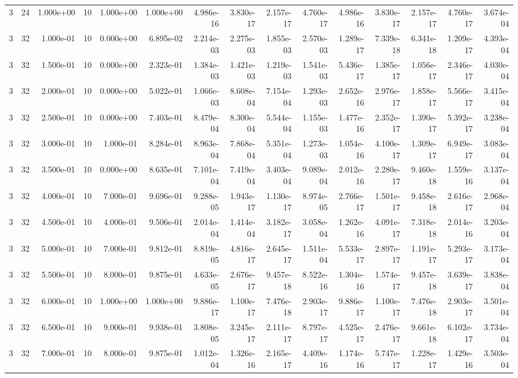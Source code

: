 \begin{tabular}{rrrrrrrrrrrrrrr}
3 & 24 & 1.000e+00 & 10 & 1.000e+00 & 1.000e+00 & 4.986e-16 & 3.830e-17 & 2.157e-17 & 4.760e-17 & 4.986e-16 & 3.830e-17 & 2.157e-17 & 4.760e-17 & 3.674e-04 \\
3 & 32 & 1.000e-01 & 10 & 0.000e+00 & 6.895e-02 & 2.214e-03 & 2.275e-03 & 1.855e-03 & 2.570e-03 & 1.289e-17 & 7.339e-18 & 6.341e-18 & 1.209e-17 & 4.393e-04 \\
3 & 32 & 1.500e-01 & 10 & 0.000e+00 & 2.323e-01 & 1.384e-03 & 1.421e-03 & 1.219e-03 & 1.541e-03 & 5.436e-17 & 1.385e-17 & 1.056e-17 & 2.346e-17 & 4.030e-04 \\
3 & 32 & 2.000e-01 & 10 & 0.000e+00 & 5.022e-01 & 1.066e-03 & 8.608e-04 & 7.154e-04 & 1.293e-03 & 2.652e-16 & 2.976e-17 & 1.858e-17 & 5.566e-17 & 3.415e-04 \\
3 & 32 & 2.500e-01 & 10 & 0.000e+00 & 7.403e-01 & 8.479e-04 & 8.300e-04 & 5.544e-04 & 1.155e-03 & 1.477e-16 & 2.352e-17 & 1.390e-17 & 5.392e-17 & 3.238e-04 \\
3 & 32 & 3.000e-01 & 10 & 1.000e-01 & 8.284e-01 & 8.963e-04 & 7.868e-04 & 5.351e-04 & 1.273e-03 & 1.054e-16 & 4.100e-17 & 1.309e-17 & 6.949e-17 & 3.083e-04 \\
3 & 32 & 3.500e-01 & 10 & 0.000e+00 & 8.635e-01 & 7.101e-04 & 7.419e-04 & 3.403e-04 & 9.089e-04 & 2.012e-16 & 2.280e-17 & 9.460e-18 & 1.559e-16 & 3.137e-04 \\
3 & 32 & 4.000e-01 & 10 & 7.000e-01 & 9.696e-01 & 9.288e-05 & 1.943e-17 & 1.130e-17 & 8.974e-05 & 2.766e-17 & 1.501e-17 & 9.458e-18 & 2.616e-17 & 2.968e-04 \\
3 & 32 & 4.500e-01 & 10 & 4.000e-01 & 9.506e-01 & 2.014e-04 & 1.414e-04 & 3.182e-17 & 3.058e-04 & 1.262e-16 & 4.091e-17 & 7.318e-18 & 2.014e-16 & 3.203e-04 \\
3 & 32 & 5.000e-01 & 10 & 7.000e-01 & 9.812e-01 & 8.819e-05 & 4.816e-17 & 2.645e-17 & 1.511e-04 & 5.533e-17 & 2.897e-17 & 1.191e-17 & 5.293e-17 & 3.173e-04 \\
3 & 32 & 5.500e-01 & 10 & 8.000e-01 & 9.875e-01 & 4.633e-05 & 2.676e-17 & 9.457e-18 & 8.522e-16 & 1.304e-16 & 1.574e-17 & 9.457e-18 & 3.639e-17 & 3.838e-04 \\
3 & 32 & 6.000e-01 & 10 & 1.000e+00 & 1.000e+00 & 9.886e-17 & 1.100e-17 & 7.476e-18 & 2.903e-17 & 9.886e-17 & 1.100e-17 & 7.476e-18 & 2.903e-17 & 3.501e-04 \\
3 & 32 & 6.500e-01 & 10 & 9.000e-01 & 9.938e-01 & 3.808e-05 & 3.245e-17 & 2.111e-17 & 8.797e-17 & 4.525e-17 & 2.476e-17 & 9.661e-18 & 6.102e-17 & 3.734e-04 \\
3 & 32 & 7.000e-01 & 10 & 8.000e-01 & 9.875e-01 & 1.012e-04 & 1.326e-16 & 2.165e-17 & 4.409e-16 & 1.174e-16 & 5.747e-17 & 1.228e-17 & 1.429e-16 & 3.503e-04 \\

\end{tabular}
